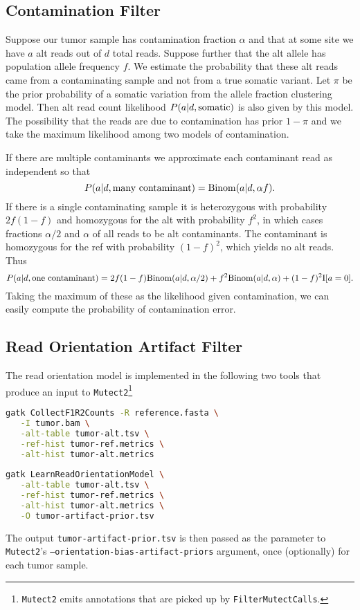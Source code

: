 \documentclass[nofootinbib,amssymb,amsmath]{revtex4}
\newcommand{\code}[1]{\texttt{#1}}
\begin{document}
\subsection{Contamination Filter}\label{contamination-filter}
Suppose our tumor sample has contamination fraction $\alpha$ and that at some site we have $a$ alt reads out of $d$ total reads.  Suppose further that the alt allele has population allele frequency $f$.  We estimate the probability that these alt reads came from a contaminating sample and not from a true somatic variant.  Let $\pi$ be the prior probability of a somatic variation from the allele fraction clustering model.  Then alt read count likelihood $P(a | d, {\rm somatic})$ is also given by this model.  The possibility that the reads are due to contamination has prior $1 - \pi$ and we take the maximum likelihood among two models of contamination.

If there are multiple contaminants we approximate each contaminant read as independent so that
\begin{equation}
P(a | d, {\rm many~contaminant}) = {\rm Binom}(a | d, \alpha f).
\end{equation}
If there is a single contaminating sample it is heterozygous with probability $2f(1-f)$ and homozygous for the alt with probability $f^2$, in which cases fractions $\alpha/2$ and $\alpha$ of all reads to be alt contaminants.  The contaminant is homozygous for the ref with probability $(1-f)^2$, which yields no alt reads. Thus
\begin{equation}
P(a | d, {\rm one~contaminant}) = 2f(1-f) {\rm Binom}(a | d, \alpha /2) + f^2 {\rm Binom}(a | d, \alpha) + (1-f)^2 {\rm I}[a = 0].
\end{equation}
Taking the maximum of these as the likelihood given contamination, we can easily compute the probability of contamination error.

\subsection{Read Orientation Artifact Filter}
The read orientation model is implemented in the following two tools that produce an input to \code{Mutect2}\footnote{\code{Mutect2} emits annotations that are picked up by \code{FilterMutectCalls}.}

\begin{lstlisting}[language=bash,caption={LearnReadOrientationModel command}, label={cmd-mutect2}]
gatk CollectF1R2Counts -R reference.fasta \
   -I tumor.bam \
   -alt-table tumor-alt.tsv \
   -ref-hist tumor-ref.metrics \
   -alt-hist tumor-alt.metrics
   
gatk LearnReadOrientationModel \
   -alt-table tumor-alt.tsv \
   -ref-hist tumor-ref.metrics \
   -alt-hist tumor-alt.metrics \
   -O tumor-artifact-prior.tsv
\end{lstlisting}
The output \code{tumor-artifact-prior.tsv} is then passed as the parameter to \code{Mutect2}'s \code{--orientation-bias-artifact-priors} argument, once (optionally) for each tumor sample.
\end{document}
